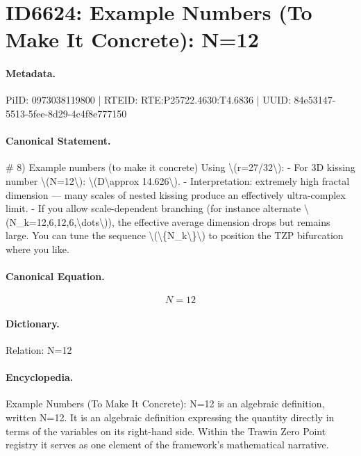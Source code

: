 \section*{ID6624: Example Numbers (To Make It Concrete): N=12}
\paragraph{Metadata.}
PiID: 0973038119800 | RTEID: RTE:P25722.4630:T4.6836 | UUID: 84e53147-5513-5fee-8d29-4c4f8e777150

\paragraph{Canonical Statement.}
\# 8) Example numbers (to make it concrete) Using \textbackslash{}(r=27/32\textbackslash{}): - For 3D kissing number \textbackslash{}(N=12\textbackslash{}): \textbackslash{}(D\textbackslash{}approx 14.626\textbackslash{}). - Interpretation: extremely high fractal dimension — many scales of nested kissing produce an effectively ultra-complex limit. - If you allow scale-dependent branching (for instance alternate \textbackslash{}(N\_k=12,6,12,6,\textbackslash{}dots\textbackslash{})), the effective average dimension drops but remains large. You can tune the sequence \textbackslash{}(\textbackslash{}\{N\_k\textbackslash{}\}\textbackslash{}) to position the TZP bifurcation where you like.

\paragraph{Canonical Equation.}
\[
N=12
\]

\paragraph{Dictionary.}
Relation: N=12

\paragraph{Encyclopedia.}
Example Numbers (To Make It Concrete): N=12 is an algebraic definition, written N=12. It is an algebraic definition expressing the quantity directly in terms of the variables on its right-hand side. Within the Trawin Zero Point registry it serves as one element of the framework's mathematical narrative.
